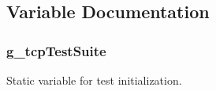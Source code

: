 \subsection{Variable Documentation}
\subsubsection[{\texorpdfstring{g\+\_\+tcp\+Test\+Suite}{g_tcpTestSuite}}]{ g\+\_\+tcp\+Test\+Suite\hspace{0.3cm}{\ttfamily [static]}}\hypertarget{tcp-test_8cc_a1b0e0b0779ee026429208907d8b0e514}{}\label{tcp-test_8cc_a1b0e0b0779ee026429208907d8b0e514}


Static variable for test initialization. 

